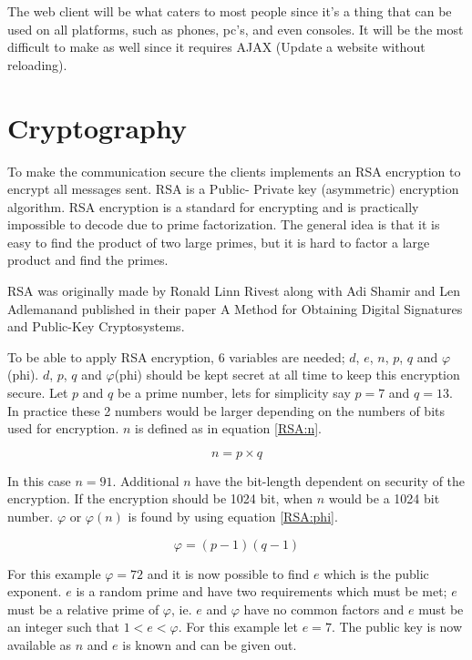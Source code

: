 The web client will be what caters to most people since it's a thing that can be used on all platforms, such as phones, pc's, and even consoles. It will be the most difficult to make as well since it requires AJAX (Update a website without reloading).

\section{Cryptography}

To make the communication secure the clients implements an RSA encryption to encrypt all messages sent. RSA is a Public- Private key (asymmetric) encryption algorithm. RSA encryption is a standard for encrypting and is practically impossible to decode due to prime factorization. The general idea is that it is easy to find the product of two large primes, but it is hard to factor a large product and find the primes.

RSA was originally made by Ronald Linn Rivest along with Adi Shamir and Len Adlemanand published in their paper A Method for Obtaining Digital Signatures and Public-Key Cryptosystems\cite{RSA}.

To be able to apply RSA encryption, 6 variables are needed; $d$, $e$, $n$, $p$, $q$ and $\varphi$(phi). $d$, $p$, $q$ and $\varphi$(phi) should be kept secret at all time to keep this encryption secure. Let $p$ and $q$ be a prime number, lets for simplicity say $p=7$ and $q=13$. In practice these 2 numbers would be larger depending on the numbers of bits used for encryption. $n$ is defined as in equation \ref{RSA:n}.

\begin{equation}
n = p \times q
\label{RSA:n}
\end{equation}

In this case $n=91$. Additional $n$ have the bit-length dependent on security of the encryption. If the encryption should be 1024 bit, when $n$ would be a 1024 bit number. $\varphi$ or $\varphi(n)$ is found by using equation \ref{RSA:phi}.

\begin{equation}
\varphi = (p-1)(q-1)
\label{RSA:phi}
\end{equation}

For this example $\varphi = 72$ and it is now possible to find $e$ which is the public exponent. $e$ is a random prime and have two requirements which must be met; $e$ must be a relative prime of $\varphi$, ie. $e$ and $\varphi$ have no common factors and $e$ must be an integer such that $1 < e < \varphi$. For this example let $e=7$. The public key is now available as $n$ and $e$ is known and can be given out.

